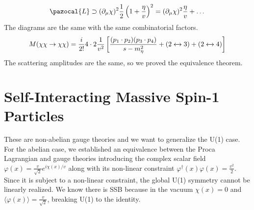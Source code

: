 \documentclass[../main.tex]{subfiles}
\begin{document}
\[
\pazocal{L}\supset(\partial_\mu\chi)^2\frac{1}{2}\left(1+\frac{\eta}{v}\right)^2=(\partial_\mu\chi)^2\frac{\eta}{v}+\dots
\]
The diagrams are the same with the same combinatorial factors.
\[
M(\chi\chi\to\chi\chi)=\frac{i}{2!}4\cdot2\frac{1}{v^2}\left[\frac{(p_1\cdot p_2)(p_3\cdot p_4)}{s-m_\eta^2}+(2\xleftrightarrow[]{}3)+(2\xleftrightarrow[]{}4)\right]
\]
The scattering amplitudes are the same, so we proved the equivalence theorem.
\section{Self-Interacting Massive Spin-1 Particles}
These are non-abelian gauge theories and we want to generalize the U(1) case. For the abelian case, we established an equivalence between the Proca Lagrangian and gauge theories introducing the complex scalar field $\varphi(x)=\frac{v}{\sqrt{2}}e^{i\chi(x)/v}$ along with its non-linear constraint $\varphi^\dagger(x)\varphi(x)=\frac{v^2}{2}$. Since it is subject to a non-linear constraint, the global U(1) symmetry cannot be linearly realized. We know there is SSB because in the vacuum $\chi(x)=0$ and $\langle\varphi(x)\rangle=\frac{v}{\sqrt{2}}$, breaking U(1) to the identity.\\
\end{document}
